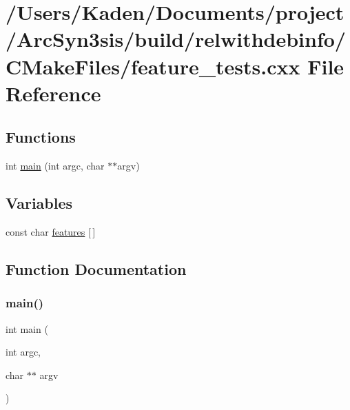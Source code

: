 \hypertarget{a00834}{}\section{/\+Users/\+Kaden/\+Documents/project/\+Arc\+Syn3sis/build/relwithdebinfo/\+C\+Make\+Files/feature\+\_\+tests.cxx File Reference}
\label{a00834}
\subsection*{Functions}
\begin{DoxyCompactItemize}
\item 
int \hyperlink{a00834_a3c04138a5bfe5d72780bb7e82a18e627}{main} (int argc, char $\ast$$\ast$argv)
\end{DoxyCompactItemize}
\subsection*{Variables}
\begin{DoxyCompactItemize}
\item 
const char \hyperlink{a00834_a1582568e32f689337602a16bf8a5bff0}{features} \mbox{[}$\,$\mbox{]}
\end{DoxyCompactItemize}


\subsection{Function Documentation}
\mbox{\label{a00834_a3c04138a5bfe5d72780bb7e82a18e627}} 
\subsubsection{\texorpdfstring{main()}{main()}}
{\footnotesize\ttfamily int main (\begin{DoxyParamCaption}\item[{int}]{argc,  }\item[{char $\ast$$\ast$}]{argv }\end{DoxyParamCaption})}



